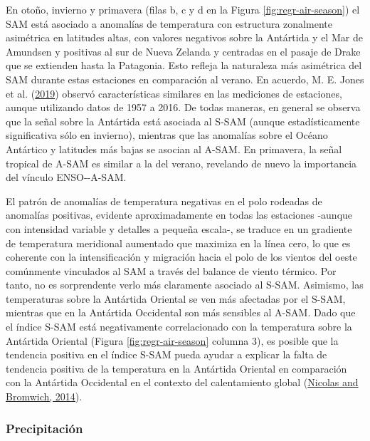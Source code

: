 \documentclass[12pt,oneside,a4paper]{reedthesis}
\begin{document}
En otoño, invierno y primavera (filas b, c y d en la Figura \ref{fig:regr-air-season}) el SAM está asociado a anomalías de temperatura con estructura zonalmente asimétrica en latitudes altas, con valores negativos sobre la Antártida y el Mar de Amundsen y positivas al sur de Nueva Zelanda y centradas en el pasaje de Drake que se extienden hasta la Patagonia.
Esto refleja la naturaleza más asimétrica del SAM durante estas estaciones en comparación al verano.
En acuerdo, M. E. Jones et al. (\protect\hyperlink{ref-jones2019}{2019}) observó características similares en las mediciones de estaciones, aunque utilizando datos de 1957 a 2016.
De todas maneras, en general se observa que la señal sobre la Antártida está asociada al S-SAM (aunque estadísticamente significativa sólo en invierno), mientras que las anomalías sobre el Océano Antártico y latitudes más bajas se asocian al A-SAM.
En primavera, la señal tropical de A-SAM es similar a la del verano, revelando de nuevo la importancia del vínculo ENSO-\/-A-SAM.

El patrón de anomalías de temperatura negativas en el polo rodeadas de anomalías positivas, evidente aproximadamente en todas las estaciones -aunque con intensidad variable y detalles a pequeña escala-, se traduce en un gradiente de temperatura meridional aumentado que maximiza en la línea cero, lo que es coherente con la intensificación y migración hacia el polo de los vientos del oeste comúnmente vinculados al SAM a través del balance de viento térmico.
Por tanto, no es sorprendente verlo más claramente asociado al S-SAM.
Asimismo, las temperaturas sobre la Antártida Oriental se ven más afectadas por el S-SAM, mientras que en la Antártida Occidental son más sensibles al A-SAM.
Dado que el índice S-SAM está negativamente correlacionado con la temperatura sobre la Antártida Oriental (Figura \ref{fig:regr-air-season} columna 3), es posible que la tendencia positiva en el índice S-SAM pueda ayudar a explicar la falta de tendencia positiva de la temperatura en la Antártida Oriental en comparación con la Antártida Occidental en el contexto del calentamiento global (\protect\hyperlink{ref-nicolas2014}{Nicolas and Bromwich, 2014}).

\hypertarget{precipitaciuxf3n}{%
\subsubsection{Precipitación}\label{precipitaciuxf3n}}
\end{document}
